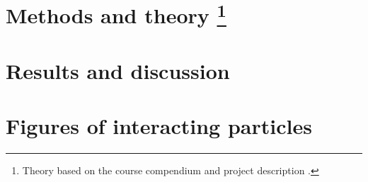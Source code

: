 \documentclass[12pt,a4paper,twocolumn]{article}
\begin{document}






\section{Methods and theory \protect\footnote{
Theory based on the course compendium and project description \cite{prosjekttbeskrivelse3}.
}}\label{sec:methods_and_theory}




\section{Results and discussion}\label{sec:results_and_discussion}








\newpage 
\twocolumn[
\printbibliography
]
\newpage
\onecolumn

\appendix


\section{Figures of interacting particles}
\end{document}
